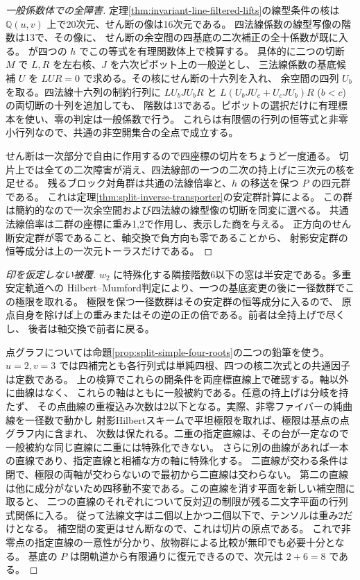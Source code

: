 \begin{proof}[一般係数体での全障害]
定理\ref{thm:invariant-line-filtered-lifts}の線型条件の核は
$\mathbb Q(u,v)$ 上で20次元、せん断の像は16次元である。
四法線係数の線型写像の階数は13で、その像に、
せん断の余空間の四基底の二次補正の全十係数が既に入る。
 が四つの $h$ でこの等式を有理関数体上で検算する。
具体的に二つの切断 $M$ で $L,R$ を左右核、$J$ を六次ピボット上の一般逆とし、
三法線係数の基底候補 $U$ を $LUR=0$ で求める。その核にせん断の十六列を入れ、
余空間の四列 $U_b$ を取る。四法線十六列の制約行列に
$L U_b J U_b R$ と $L(U_b J U_c+U_c J U_b)R$ ($b<c$) の両切断の十列を追加しても、
階数は13である。ピボットの選択だけに有理標本を使い、零の判定は一般係数で行う。
これらは有限個の行列の恒等式と非零小行列なので、共通の非空開集合の全点で成立する。

せん断は一次部分で自由に作用するので四座標の切片をちょうど一度通る。
切片上では全ての二次障害が消え、四法線部の一つの二次の持上げに三次元の核を足せる。
残るブロック対角群は共通の法線倍率と、$h$ の移送を保つ $P$ の四元群である。
これは定理\ref{thm:split-inverse-transporter}の安定群計算による。
この群は簡約的なので一次余空間および四法線の線型像の切断を同変に選べる。
共通法線倍率は二群の座標に重み1,2で作用し、表示した商を与える。
正方向のせん断安定群が零であること、軸交換で負方向も零であることから、
射影安定群の恒等成分は上の一次元トーラスだけである。
\end{proof}
\begin{proof}[印を仮定しない被覆]
$w_2$ に特殊化する隣接階数6以下の窓は半安定である。多重安定軌道への
Hilbert--Mumford判定により、一つの基底変更の後に一径数群でこの極限を取れる。
極限を保つ一径数群はその安定群の恒等成分に入るので、
原点自身を除けば上の重みまたはその逆の正の倍である。前者は全持上げで尽くし、
後者は軸交換で前者に戻る。

点グラフについては命題\ref{prop:split-simple-four-roots}の二つの鉛筆を使う。
$u=2,v=3$ では四補完とも各行列式は単純四根、四つの核二次式との共通因子は定数である。
上の検算でこれらの開条件を両座標直線上で確認する。軸以外に曲線はなく、
これらの軸はともに一般被約である。任意の持上げは分岐を持たず、
その点曲線の重複込み次数は2以下となる。実際、非零ファイバーの純曲線を一径数で動かし
射影Hilbertスキームで平坦極限を取れば、極限は基点の点グラフ内に含まれ、
次数は保たれる。二重の指定直線は、その台が一定なので一般被約な同じ直線に二重には特殊化できない。
さらに別の曲線があれば一本の直線であり、指定直線と相補な方の軸に特殊化する。
二直線が交わる条件は閉で、極限の両軸が交わらないので最初から二直線は交わらない。
第二の直線は他に成分がないため四移動不変である。この直線を消す平面を新しい補空間に取ると、
二つの直線のそれぞれについて反対辺の制限が残る二文字平面の行列式関係に入る。
従って法線文字は二個以上かつ二個以下で、テンソルは重み2だけとなる。
補空間の変更はせん断なので、これは切片の原点である。
これで非零点の指定直線の一意性が分かり、放物群による比較が無印でも必要十分となる。
基底の $P$ は閉軌道から有限通りに復元できるので、次元は $2+6=8$ である。
\end{proof}
